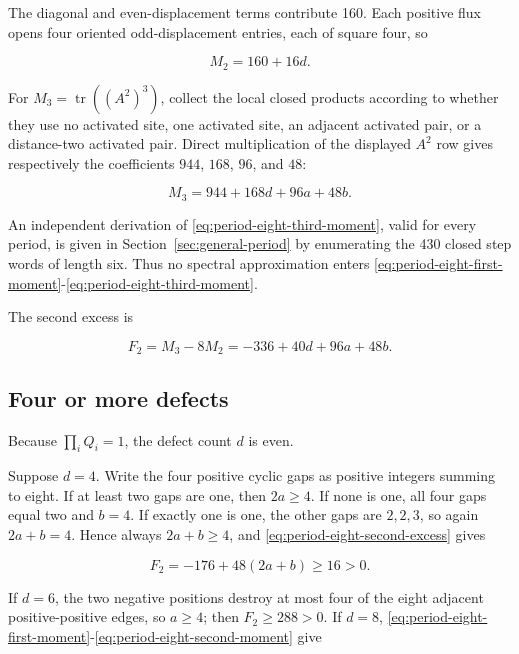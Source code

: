 The diagonal and even-displacement terms contribute 160. Each positive flux
opens four oriented odd-displacement entries, each of square four, so

\begin{equation}
\label{eq:period-eight-second-moment}
M_{2}=160+16d.
\end{equation}

For \(M_{3}=\operatorname{tr}((A^{2})^{3})\), collect the local closed products according to whether
they use no activated site, one activated site, an adjacent activated pair, or
a distance-two activated pair. Direct multiplication of the displayed
\(A^{2}\) row gives respectively the coefficients \(944\), \(168\), \(96\), and \(48\):

\begin{equation}
\label{eq:period-eight-third-moment}
M_{3}=944+168d+96a+48b.
\end{equation}

An independent derivation of \eqref{eq:period-eight-third-moment}, valid for every period, is given in
Section~\ref{sec:general-period} by enumerating the 430 closed step words of length six. Thus no
spectral approximation enters \eqref{eq:period-eight-first-moment}-\eqref{eq:period-eight-third-moment}.

The second excess is

\begin{equation}
\label{eq:period-eight-second-excess}
F_{2}=M_{3}-8M_{2}=-336+40d+96a+48b.
\end{equation}

\subsection{Four or more defects}\label{subsec:four-or-more-defects}

Because \(\prod_i Q_i=1\), the defect count \(d\) is even.

Suppose \(d=4\). Write the four positive cyclic gaps as positive integers
summing to eight. If at least two gaps are one, then \(2a\geq 4\). If none is one,
all four gaps equal two and \(b=4\). If exactly one is one, the other gaps are
\(2,2,3\), so again \(2a+b=4\). Hence always \(2a+b\geq 4\), and \eqref{eq:period-eight-second-excess} gives

\begin{equation}
F_{2}=-176+48(2a+b)\geq 16>0.
\end{equation}

If \(d=6\), the two negative positions destroy at most four of the eight
adjacent positive-positive edges, so \(a\geq 4\); then \(F_{2}\geq 288>0\). If \(d=8\),
\eqref{eq:period-eight-first-moment}-\eqref{eq:period-eight-second-moment} give

